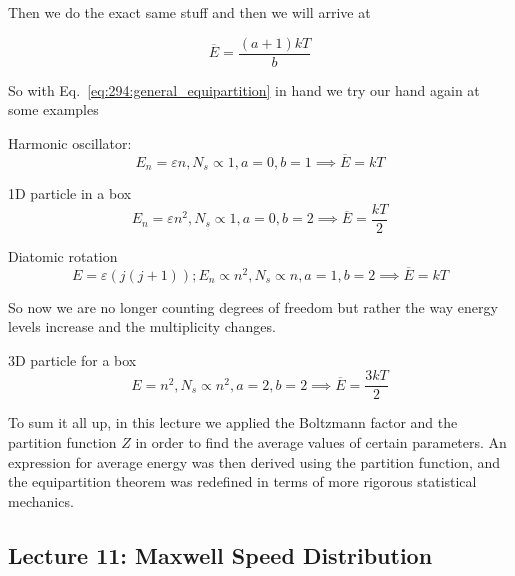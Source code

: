 \documentclass[10pt]{article}
\begin{document}
Then we do the exact same stuff and then we will arrive at 

\begin{equation}
	\overline{E} = \frac{(a+1)kT}{b}
	\label{eq:294:general_equipartition}
\end{equation}

So with Eq.~\ref{eq:294:general_equipartition} in hand we try our hand again at some examples


\begin{example}
	Harmonic oscillator:
	\begin{equation}
		E_n = \varepsilon n, N_s \propto 1, a = 0, b = 1  \implies \overline{E} = kT
	\end{equation}
	
	1D particle in a box
	\begin{equation}
		E_n = \varepsilon n^2, N_s \propto 1, a = 0, b = 2  \implies \overline{E} = \frac{kT}{2}
	\end{equation}

	Diatomic rotation
	\begin{equation}
		E = \varepsilon(j(j+1)); E_n \propto n^2 , N_s \propto n, a = 1, b = 2  \implies \overline{E} = kT
	\end{equation}

	So now we are no longer counting degrees of freedom but rather the way energy levels increase and the multiplicity changes.


	3D particle for a box
	\begin{equation}
		E = n^2 , N_s \propto n^2, a = 2, b = 2  \implies \overline{E} = \frac{3kT}{2}
	\end{equation}

\end{example}



To sum it all up, in this lecture we applied the Boltzmann factor and the partition function $ Z $  in order to find the average values of certain parameters.
An expression for average energy was then derived using the partition function, and the equipartition theorem was redefined in terms of more rigorous statistical mechanics.



\subsection{Lecture 11: Maxwell Speed Distribution}
\end{document}
